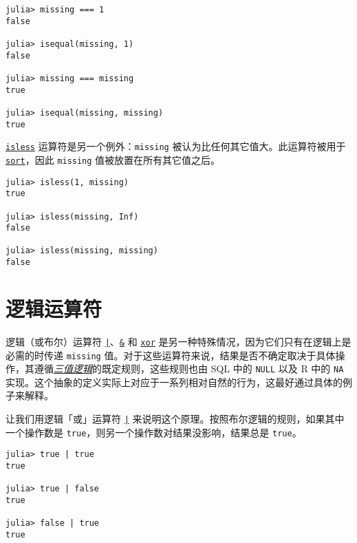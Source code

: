 \begin{verbatim}
julia> missing === 1
false

julia> isequal(missing, 1)
false

julia> missing === missing
true

julia> isequal(missing, missing)
true
\end{verbatim}



\hyperlink{8062916604071842790}{\texttt{isless}} 运算符是另一个例外：\texttt{missing} 被认为比任何其它值大。此运算符被用于 \hyperlink{8473525809131227606}{\texttt{sort}}，因此 \texttt{missing} 值被放置在所有其它值之后。




\begin{verbatim}
julia> isless(1, missing)
true

julia> isless(missing, Inf)
false

julia> isless(missing, missing)
false
\end{verbatim}



\hypertarget{2677689633086417735}{}


\section{逻辑运算符}



逻辑（或布尔）运算符 \hyperlink{9633687763646488853}{\texttt{|}}、\hyperlink{1494761116451616317}{\texttt{\&}} 和 \hyperlink{7071880015536674935}{\texttt{xor}} 是另一种特殊情况，因为它们只有在逻辑上是必需的时传递 \texttt{missing} 值。对于这些运算符来说，结果是否不确定取决于具体操作，其遵循\href{https://en.wikipedia.org/wiki/Three-valued\_logic}{\emph{三值逻辑}}的既定规则，这些规则也由 SQL 中的 \texttt{NULL} 以及 R 中的 \texttt{NA} 实现。这个抽象的定义实际上对应于一系列相对自然的行为，这最好通过具体的例子来解释。



让我们用逻辑「或」运算符 \hyperlink{9633687763646488853}{\texttt{|}} 来说明这个原理。按照布尔逻辑的规则，如果其中一个操作数是 \texttt{true}，则另一个操作数对结果没影响，结果总是 \texttt{true}。




\begin{verbatim}
julia> true | true
true

julia> true | false
true

julia> false | true
true
\end{verbatim}



